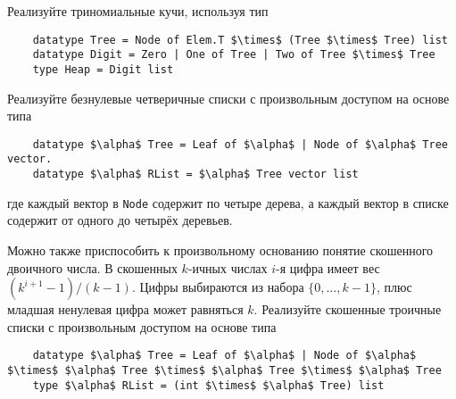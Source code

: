 \ifanswers
\begin{frame}[fragile]{}
\begin{exercise}\label{ex:9.17}
  Реализуйте триномиальные кучи, используя тип
  \begin{lstlisting}
    datatype Tree = Node of Elem.T $\times$ (Tree $\times$ Tree) list
    datatype Digit = Zero | One of Tree | Two of Tree $\times$ Tree
    type Heap = Digit list
  \end{lstlisting}
\end{exercise}

\begin{exercise}\label{ex:9.18}
  Реализуйте безнулевые четверичные списки с произвольным доступом на
  основе типа
  \begin{lstlisting}
    datatype $\alpha$ Tree = Leaf of $\alpha$ | Node of $\alpha$ Tree vector.
    datatype $\alpha$ RList = $\alpha$ Tree vector list
  \end{lstlisting}
  где каждый вектор в \lstinline!Node! содержит по четыре дерева, а
  каждый вектор в списке содержит от одного до четырёх деревьев.
\end{exercise}

\begin{exercise}\label{ex:9.19}
  Можно также приспособить к произвольному основанию понятие
  скошенного двоичного числа. В скошенных $k$-ичных числах $i$-я цифра
  имеет вес $(k^{i+1} - 1) / (k - 1)$. Цифры выбираются из набора
  $\{0, \ldots, k-1\}$, плюс младшая ненулевая цифра может равняться
  $k$. Реализуйте скошенные троичные списки с произвольным доступом на
  основе типа
  \begin{lstlisting}
    datatype $\alpha$ Tree = Leaf of $\alpha$ | Node of $\alpha$ $\times$ $\alpha$ Tree $\times$ $\alpha$ Tree $\times$ $\alpha$ Tree
    type $\alpha$ RList = (int $\times$ $\alpha$ Tree) list
  \end{lstlisting}
\end{exercise}
\end{frame}
\fi

\begin{comment}
\section{Примечания}
\label{sc:9.5}

\begin{frame}[fragile]{}
Структуры данных, которые можно описать как числовые представления,
встречаются на удивление часто, но явным образом связь с
каким-либо вариантом системы счисления упоминают лишь изредка
\cite{Guibas-etal1977, Myers1983, CarlssonMunroPoblete1988,
  KaplanTarjan1996b}. Скошенные списки с произвольным доступом впервые
появились в \cite{Okasaki1996b}. Скошенные биномиальные кучи
описаны в \cite{BrodalOkasaki1996}.
\end{frame}
\end{comment}

